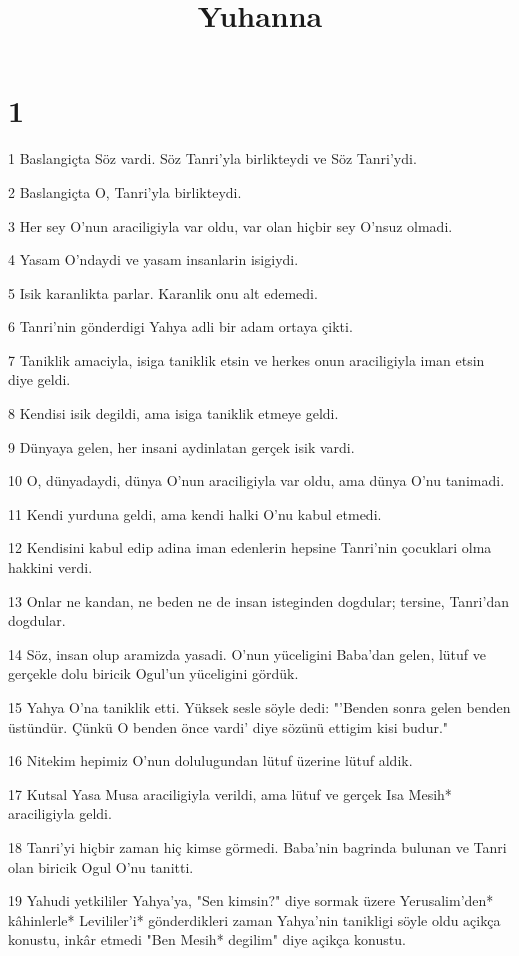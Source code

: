 

\title{Yuhanna}


\chapter{1}

\par 1 Baslangiçta Söz vardi. Söz Tanri'yla birlikteydi ve Söz Tanri'ydi.
\par 2 Baslangiçta O, Tanri'yla birlikteydi.
\par 3 Her sey O'nun araciligiyla var oldu, var olan hiçbir sey O'nsuz olmadi.
\par 4 Yasam O'ndaydi ve yasam insanlarin isigiydi.
\par 5 Isik karanlikta parlar. Karanlik onu alt edemedi.
\par 6 Tanri'nin gönderdigi Yahya adli bir adam ortaya çikti.
\par 7 Taniklik amaciyla, isiga taniklik etsin ve herkes onun araciligiyla iman etsin diye geldi.
\par 8 Kendisi isik degildi, ama isiga taniklik etmeye geldi.
\par 9 Dünyaya gelen, her insani aydinlatan gerçek isik vardi.
\par 10 O, dünyadaydi, dünya O'nun araciligiyla var oldu, ama dünya O'nu tanimadi.
\par 11 Kendi yurduna geldi, ama kendi halki O'nu kabul etmedi.
\par 12 Kendisini kabul edip adina iman edenlerin hepsine Tanri'nin çocuklari olma hakkini verdi.
\par 13 Onlar ne kandan, ne beden ne de insan isteginden dogdular; tersine, Tanri'dan dogdular.
\par 14 Söz, insan olup aramizda yasadi. O'nun yüceligini Baba'dan gelen, lütuf ve gerçekle dolu biricik Ogul'un yüceligini gördük.
\par 15 Yahya O'na taniklik etti. Yüksek sesle söyle dedi: "'Benden sonra gelen benden üstündür. Çünkü O benden önce vardi' diye sözünü ettigim kisi budur."
\par 16 Nitekim hepimiz O'nun dolulugundan lütuf üzerine lütuf aldik.
\par 17 Kutsal Yasa Musa araciligiyla verildi, ama lütuf ve gerçek Isa Mesih* araciligiyla geldi.
\par 18 Tanri'yi hiçbir zaman hiç kimse görmedi. Baba'nin bagrinda bulunan ve Tanri olan biricik Ogul O'nu tanitti.
\par 19 Yahudi yetkililer Yahya'ya, "Sen kimsin?" diye sormak üzere Yerusalim'den* kâhinlerle* Levililer'i* gönderdikleri zaman Yahya'nin tanikligi söyle oldu açikça konustu, inkâr etmedi "Ben Mesih* degilim" diye açikça konustu.
